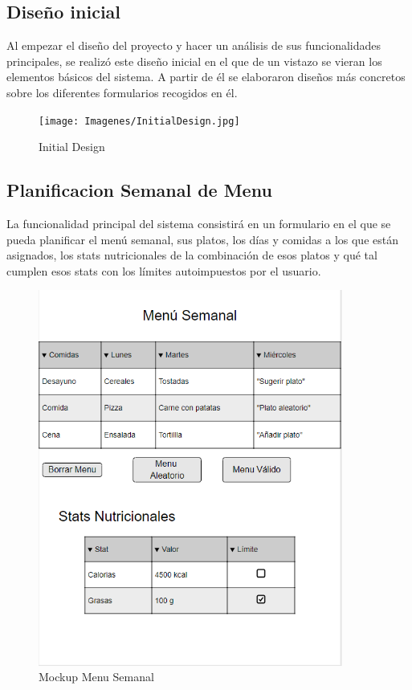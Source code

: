 \documentclass[12pt, a4paper, twoside]{book}
\begin{document}
	\subsection{Diseño inicial}
	Al empezar el diseño del proyecto y hacer un análisis de sus funcionalidades principales, se realizó este diseño inicial en el que de un vistazo se vieran los elementos básicos del sistema. A partir de él se elaboraron diseños más concretos sobre los diferentes formularios recogidos en él.
	\begin{figure}[H]
		\centering
		\texttt{[image: Imagenes/InitialDesign.jpg]}
		\caption{Initial Design}\label{Initial Design}
	\end{figure}	
	\subsection{Planificacion Semanal de Menu}	
	
	La funcionalidad principal del sistema consistirá en un formulario en el que se pueda planificar el menú semanal, sus platos, los días y comidas a los que están asignados, los stats nutricionales de la combinación de esos platos y qué tal cumplen esos stats con los límites autoimpuestos por el usuario.
	
	\begin{figure}[H]
		\centering
		\includegraphics[width=10cm]{Imagenes/MockupMenuSemanal.png}
		\caption{Mockup Menu Semanal}\label{Mockup Menu Semanal}
	\end{figure}
\end{document}
